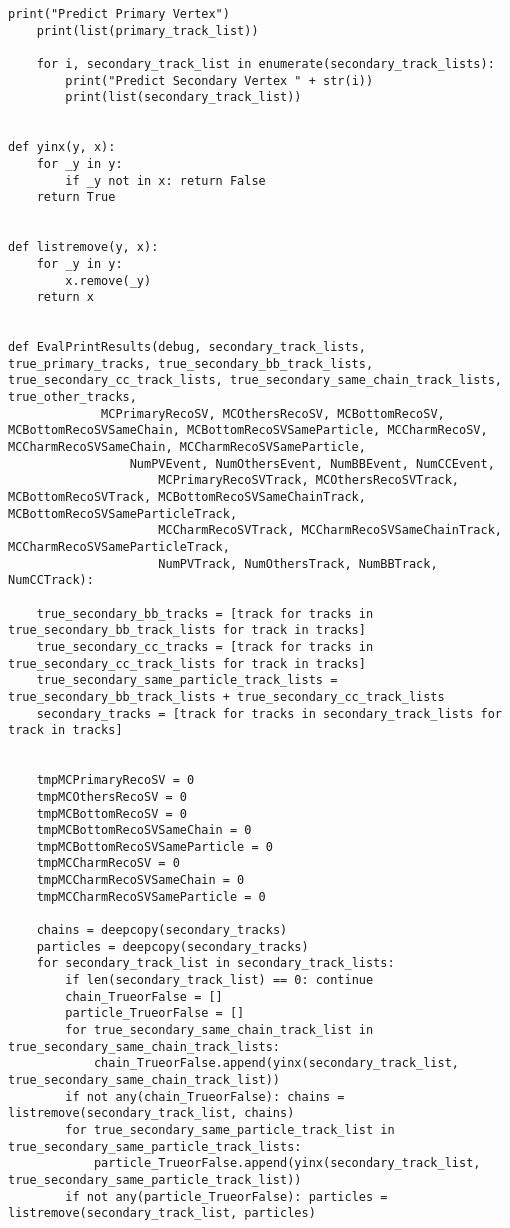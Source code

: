 \begin{lstlisting}[caption=崩壊点検出アルゴリズム用関数,label=VertexFinder1]
    print("Predict Primary Vertex")
    print(list(primary_track_list))

    for i, secondary_track_list in enumerate(secondary_track_lists):
        print("Predict Secondary Vertex " + str(i))
        print(list(secondary_track_list))


def yinx(y, x):
    for _y in y:
        if _y not in x: return False
    return True


def listremove(y, x):
    for _y in y:
        x.remove(_y)
    return x


def EvalPrintResults(debug, secondary_track_lists, true_primary_tracks, true_secondary_bb_track_lists, true_secondary_cc_track_lists, true_secondary_same_chain_track_lists, true_other_tracks,
		     MCPrimaryRecoSV, MCOthersRecoSV, MCBottomRecoSV, MCBottomRecoSVSameChain, MCBottomRecoSVSameParticle, MCCharmRecoSV, MCCharmRecoSVSameChain, MCCharmRecoSVSameParticle,
	             NumPVEvent, NumOthersEvent, NumBBEvent, NumCCEvent,
                     MCPrimaryRecoSVTrack, MCOthersRecoSVTrack, MCBottomRecoSVTrack, MCBottomRecoSVSameChainTrack, MCBottomRecoSVSameParticleTrack,
                     MCCharmRecoSVTrack, MCCharmRecoSVSameChainTrack, MCCharmRecoSVSameParticleTrack,
                     NumPVTrack, NumOthersTrack, NumBBTrack, NumCCTrack):

    true_secondary_bb_tracks = [track for tracks in true_secondary_bb_track_lists for track in tracks]
    true_secondary_cc_tracks = [track for tracks in true_secondary_cc_track_lists for track in tracks]
    true_secondary_same_particle_track_lists = true_secondary_bb_track_lists + true_secondary_cc_track_lists
    secondary_tracks = [track for tracks in secondary_track_lists for track in tracks]


    tmpMCPrimaryRecoSV = 0
    tmpMCOthersRecoSV = 0
    tmpMCBottomRecoSV = 0
    tmpMCBottomRecoSVSameChain = 0
    tmpMCBottomRecoSVSameParticle = 0
    tmpMCCharmRecoSV = 0
    tmpMCCharmRecoSVSameChain = 0
    tmpMCCharmRecoSVSameParticle = 0

    chains = deepcopy(secondary_tracks)
    particles = deepcopy(secondary_tracks)
    for secondary_track_list in secondary_track_lists:
        if len(secondary_track_list) == 0: continue
        chain_TrueorFalse = []
        particle_TrueorFalse = []
        for true_secondary_same_chain_track_list in true_secondary_same_chain_track_lists:
            chain_TrueorFalse.append(yinx(secondary_track_list, true_secondary_same_chain_track_list))
        if not any(chain_TrueorFalse): chains = listremove(secondary_track_list, chains)
        for true_secondary_same_particle_track_list in true_secondary_same_particle_track_lists:
            particle_TrueorFalse.append(yinx(secondary_track_list, true_secondary_same_particle_track_list))
        if not any(particle_TrueorFalse): particles = listremove(secondary_track_list, particles)


\end{lstlisting}
